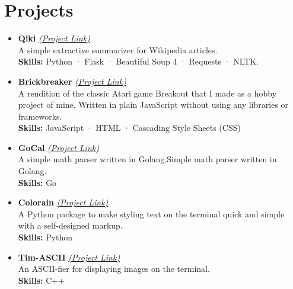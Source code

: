 \documentclass[12pt]{article}
\begin{document}
\section{Projects}
\begin{itemize}
    \itemsep=-0em
    \item \textbf{Qiki} \textit{\href{https://github.com/susmit31/Qiki}{(Project Link)}} \\ 
	A simple extractive summarizer for Wikipedia articles.\\
	\textbf{Skills:} Python · Flask · Beautiful Soup 4 · Requests · NLTK.
    \item \textbf{Brickbreaker} \textit{\href{https://susmit31.itch.io/brickbreaker}{(Project Link)}} \\ 
	A rendition of the classic Atari game Breakout that I made as a hobby project of mine. Written in plain JavaScript without using any libraries or frameworks.\\
	\textbf{Skills:} JavaScript · HTML · Cascading Style Sheets (CSS)
    \item \textbf{GoCal} \textit{\href{https://github.com/susmit31/GoCal}{(Project Link)}} \\ 
	A simple math parser written in Golang.Simple math parser written in Golang.\\
	\textbf{Skills:} Go
    \item \textbf{Colorain} \textit{\href{https://github.com/susmit31/colorain}{(Project Link)}} \\ 
	A Python package to make styling text on the terminal quick and simple with a self-designed markup.\\
	\textbf{Skills:} Python
    \item \textbf{Tim-ASCII} \textit{\href{https://github.com/susmit31/Tim-ASCII}{(Project Link)}} \\ 
	An ASCII-fier for displaying images on the terminal.\\
	\textbf{Skills:} C++
\end{itemize}
\end{document}
